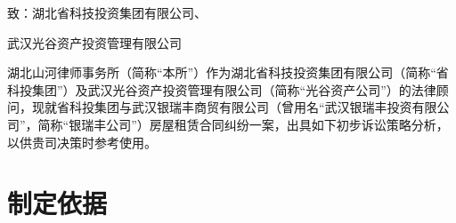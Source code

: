 \documentclass[fontset=none]{ctexart}
\begin{document}
\newpage

\pagestyle{empty}
\setcounter{page}{0}
\tableofcontents

\newpage

\pagestyle{fancy}
\noindent {}

\vspace{1em}

\noindent {}

\vspace{1em}
\noindent {}\par
\vspace{1.5em}

\noindent 致：湖北省科技投资集团有限公司、\par
武汉光谷资产投资管理有限公司
\vspace{1em}



湖北山河律师事务所（简称“本所”）作为湖北省科技投资集团有限公司（简称“省科投集团”）及武汉光谷资产投资管理有限公司（简称“光谷资产公司”）的法律顾问，现就省科投集团与武汉银瑞丰商贸有限公司（曾用名“武汉银瑞丰投资有限公司”，简称“银瑞丰公司”）房屋租赁合同纠纷一案，出具如下初步诉讼策略分析，以供贵司决策时参考使用。



\section{制定依据} %
\label{sec:制定依据}
\end{document}
